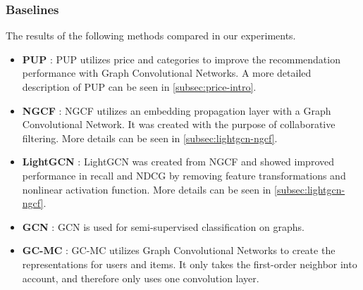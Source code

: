 \subsubsection{Baselines}
The results of the following methods compared in our experiments.
\begin{itemize}
    \item \textbf{PUP} \cite{Priceaware}: PUP utilizes price and categories to improve the recommendation performance with Graph Convolutional Networks. A more detailed description of PUP can be seen in \autoref{subsec:price-intro}.
    \item \textbf{NGCF} \cite{NGCF_2019}: NGCF utilizes an embedding propagation layer with a Graph Convolutional Network. It was created with the purpose of collaborative filtering. More details can be seen in \autoref{subsec:lightgcn-ngcf}.
    \item \textbf{LightGCN} \cite{lightgcn}: LightGCN was created from NGCF and showed improved performance in recall and NDCG by removing feature transformations and nonlinear activation function. More details can be seen in \autoref{subsec:lightgcn-ngcf}.
    \item \textbf{GCN} \cite{kipf2017semisupervised}: GCN is used for semi-supervised classification on graphs.
    \item \textbf{GC-MC} \cite{berg2017graph}: GC-MC utilizes Graph Convolutional Networks to create the representations for users and items. It only takes the first-order neighbor into account, and therefore only uses one convolution layer.
\end{itemize}
